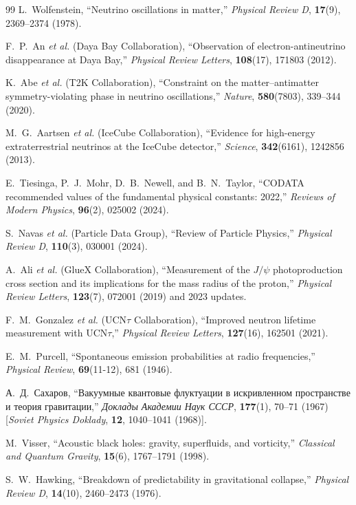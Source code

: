 \documentclass[12pt,a4paper]{article}
\begin{document}
\begin{thebibliography}{99}
	L.~Wolfenstein, 
	``Neutrino oscillations in matter,''
	\textit{Physical Review D}, \textbf{17}(9), 2369--2374 (1978).
	
	F.~P.~An \textit{et al.} (Daya Bay Collaboration), 
	``Observation of electron-antineutrino disappearance at Daya Bay,''
	\textit{Physical Review Letters}, \textbf{108}(17), 171803 (2012).
	
	K.~Abe \textit{et al.} (T2K Collaboration), 
	``Constraint on the matter--antimatter symmetry-violating phase in neutrino oscillations,''
	\textit{Nature}, \textbf{580}(7803), 339--344 (2020).
	
	M.~G.~Aartsen \textit{et al.} (IceCube Collaboration), 
	``Evidence for high-energy extraterrestrial neutrinos at the IceCube detector,''
	\textit{Science}, \textbf{342}(6161), 1242856 (2013).
	
	E.~Tiesinga, P.~J.~Mohr, D.~B.~Newell, and B.~N.~Taylor, 
	``CODATA recommended values of the fundamental physical constants: 2022,''
	\textit{Reviews of Modern Physics}, \textbf{96}(2), 025002 (2024).
	
	S.~Navas \textit{et al.} (Particle Data Group), 
	``Review of Particle Physics,''
	\textit{Physical Review D}, \textbf{110}(3), 030001 (2024).
	
	A.~Ali \textit{et al.} (GlueX Collaboration), 
	``Measurement of the $J/\psi$ photoproduction cross section and its implications for the mass radius of the proton,''
	\textit{Physical Review Letters}, \textbf{123}(7), 072001 (2019) and 2023 updates.
	
	F.~M.~Gonzalez \textit{et al.} (UCN$\tau$ Collaboration), 
	``Improved neutron lifetime measurement with UCN$\tau$,''
	\textit{Physical Review Letters}, \textbf{127}(16), 162501 (2021).
	
	E.~M.~Purcell, 
	``Spontaneous emission probabilities at radio frequencies,''
	\textit{Physical Review}, \textbf{69}(11-12), 681 (1946).
	
	А.~Д.~Сахаров, 
	``Вакуумные квантовые флуктуации в искривленном пространстве и теория гравитации,''
	\textit{Доклады Академии Наук СССР}, \textbf{177}(1), 70--71 (1967) 
	[\textit{Soviet Physics Doklady}, \textbf{12}, 1040--1041 (1968)].
	
	M.~Visser, 
	``Acoustic black holes: gravity, superfluids, and vorticity,''
	\textit{Classical and Quantum Gravity}, \textbf{15}(6), 1767--1791 (1998).
	
	S.~W.~Hawking, 
	``Breakdown of predictability in gravitational collapse,''
	\textit{Physical Review D}, \textbf{14}(10), 2460--2473 (1976).
	
\end{thebibliography}
	
\end{document}
